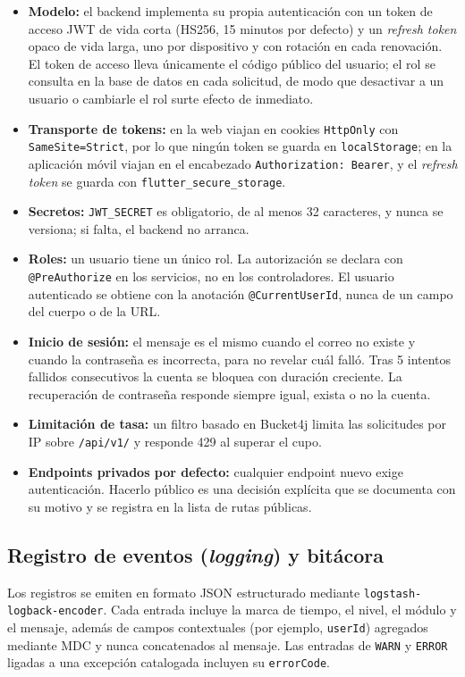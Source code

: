 \begin{itemize}
    \item \textbf{Modelo:} el backend implementa su propia autenticación con un token de acceso JWT de vida corta (HS256, 15 minutos por defecto) y un \textit{refresh token} opaco de vida larga, uno por dispositivo y con rotación en cada renovación. El token de acceso lleva únicamente el código público del usuario; el rol se consulta en la base de datos en cada solicitud, de modo que desactivar a un usuario o cambiarle el rol surte efecto de inmediato.
    \item \textbf{Transporte de tokens:} en la web viajan en cookies \texttt{HttpOnly} con \texttt{SameSite=Strict}, por lo que ningún token se guarda en \texttt{localStorage}; en la aplicación móvil viajan en el encabezado \texttt{Authorization: Bearer}, y el \textit{refresh token} se guarda con \texttt{flutter\_secure\_storage}.
    \item \textbf{Secretos:} \texttt{JWT\_SECRET} es obligatorio, de al menos 32 caracteres, y nunca se versiona; si falta, el backend no arranca.
    \item \textbf{Roles:} un usuario tiene un único rol. La autorización se declara con \texttt{@PreAuthorize} en los servicios, no en los controladores. El usuario autenticado se obtiene con la anotación \texttt{@CurrentUserId}, nunca de un campo del cuerpo o de la URL.
    \item \textbf{Inicio de sesión:} el mensaje es el mismo cuando el correo no existe y cuando la contraseña es incorrecta, para no revelar cuál falló. Tras 5 intentos fallidos consecutivos la cuenta se bloquea con duración creciente. La recuperación de contraseña responde siempre igual, exista o no la cuenta.
    \item \textbf{Limitación de tasa:} un filtro basado en Bucket4j limita las solicitudes por IP sobre \texttt{/api/v1/} y responde 429 al superar el cupo.
    \item \textbf{Endpoints privados por defecto:} cualquier endpoint nuevo exige autenticación. Hacerlo público es una decisión explícita que se documenta con su motivo y se registra en la lista de rutas públicas.
\end{itemize}

\subsection{Registro de eventos (\textit{logging}) y bitácora}

Los registros se emiten en formato JSON estructurado mediante \texttt{logstash-logback-encoder}. Cada entrada incluye la marca de tiempo, el nivel, el módulo y el mensaje, además de campos contextuales (por ejemplo, \texttt{userId}) agregados mediante MDC y nunca concatenados al mensaje. Las entradas de \texttt{WARN} y \texttt{ERROR} ligadas a una excepción catalogada incluyen su \texttt{errorCode}.

